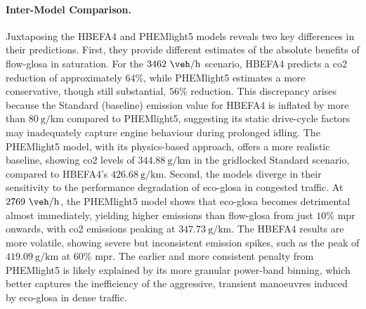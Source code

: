 \paragraph{Inter-Model Comparison.}
Juxtaposing the HBEFA4 and PHEMlight5 models reveals two key differences in their predictions. First, they provide different estimates of the absolute benefits of \ac{flow-glosa} in saturation. For the $3462~\unit{\veh\per\hour}$ scenario, HBEFA4 predicts a \ac{co2} reduction of approximately $64\%$, while PHEMlight5 estimates a more conservative, though still substantial, $56\%$ reduction. This discrepancy arises because the Standard (baseline) emission value for HBEFA4 is inflated by more than $80~\unit{\gram\per\kilo\metre}$ compared to PHEMlight5, suggesting its static drive-cycle factors may inadequately capture engine behaviour during prolonged idling. The PHEMlight5 model, with its physics-based approach, offers a more realistic baseline, showing \ac{co2} levels of $344.88~\unit{\gram\per\kilo\metre}$ in the gridlocked Standard scenario, compared to HBEFA4's $426.68~\unit{\gram\per\kilo\metre}$.
\mynewline
Second, the models diverge in their sensitivity to the performance degradation of \ac{eco-glosa} in congested traffic. At $2769~\unit{\veh\per\hour}$, the PHEMlight5 model shows that \ac{eco-glosa} becomes detrimental almost immediately, yielding higher emissions than \ac{flow-glosa} from just $10\%$ \ac{mpr} onwards, with \ac{co2} emissions peaking at $347.73~\unit{\gram\per\kilo\metre}$. The HBEFA4 results are more volatile, showing severe but inconsistent emission spikes, such as the peak of $419.09~\unit{\gram\per\kilo\metre}$ at $60\%$ \ac{mpr}. The earlier and more consistent penalty from PHEMlight5 is likely explained by its more granular power-band binning, which better captures the inefficiency of the aggressive, transient manoeuvres induced by \ac{eco-glosa} in dense traffic.

